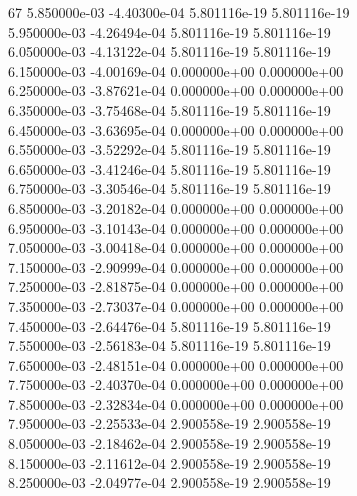 67	5.850000e-03	-4.40300e-04	5.801116e-19	5.801116e-19	\\ 	5.950000e-03	-4.26494e-04	5.801116e-19	5.801116e-19	\\ 	6.050000e-03	-4.13122e-04	5.801116e-19	5.801116e-19	\\ 	6.150000e-03	-4.00169e-04	0.000000e+00	0.000000e+00	\\ 	6.250000e-03	-3.87621e-04	0.000000e+00	0.000000e+00	\\ 	6.350000e-03	-3.75468e-04	5.801116e-19	5.801116e-19	\\ 	6.450000e-03	-3.63695e-04	0.000000e+00	0.000000e+00	\\ 	6.550000e-03	-3.52292e-04	5.801116e-19	5.801116e-19	\\ 	6.650000e-03	-3.41246e-04	5.801116e-19	5.801116e-19	\\ 	6.750000e-03	-3.30546e-04	5.801116e-19	5.801116e-19	\\ 	6.850000e-03	-3.20182e-04	0.000000e+00	0.000000e+00	\\ 	6.950000e-03	-3.10143e-04	0.000000e+00	0.000000e+00	\\ 	7.050000e-03	-3.00418e-04	0.000000e+00	0.000000e+00	\\ 	7.150000e-03	-2.90999e-04	0.000000e+00	0.000000e+00	\\ 	7.250000e-03	-2.81875e-04	0.000000e+00	0.000000e+00	\\ 	7.350000e-03	-2.73037e-04	0.000000e+00	0.000000e+00	\\ 	7.450000e-03	-2.64476e-04	5.801116e-19	5.801116e-19	\\ 	7.550000e-03	-2.56183e-04	5.801116e-19	5.801116e-19	\\ 	7.650000e-03	-2.48151e-04	0.000000e+00	0.000000e+00	\\ 	7.750000e-03	-2.40370e-04	0.000000e+00	0.000000e+00	\\ 	7.850000e-03	-2.32834e-04	0.000000e+00	0.000000e+00	\\ 	7.950000e-03	-2.25533e-04	2.900558e-19	2.900558e-19	\\ 	8.050000e-03	-2.18462e-04	2.900558e-19	2.900558e-19	\\ 	8.150000e-03	-2.11612e-04	2.900558e-19	2.900558e-19	\\ 	8.250000e-03	-2.04977e-04	2.900558e-19	2.900558e-19	\\ \hline

